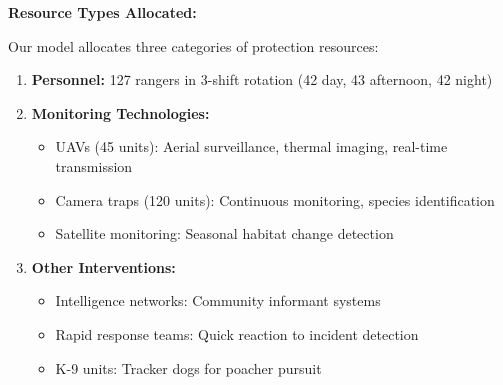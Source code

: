 \textbf{Resource Types Allocated:}

Our model allocates three categories of protection resources:
\begin{enumerate}
    \item \textbf{Personnel:} 127 rangers in 3-shift rotation (42 day, 43 afternoon, 42 night)
    \item \textbf{Monitoring Technologies:}
    \begin{itemize}
        \item UAVs (45 units): Aerial surveillance, thermal imaging, real-time transmission
        \item Camera traps (120 units): Continuous monitoring, species identification
        \item Satellite monitoring: Seasonal habitat change detection
    \end{itemize}
    \item \textbf{Other Interventions:}
    \begin{itemize}
        \item Intelligence networks: Community informant systems
        \item Rapid response teams: Quick reaction to incident detection
        \item K-9 units: Tracker dogs for poacher pursuit
    \end{itemize}
\end{enumerate}
